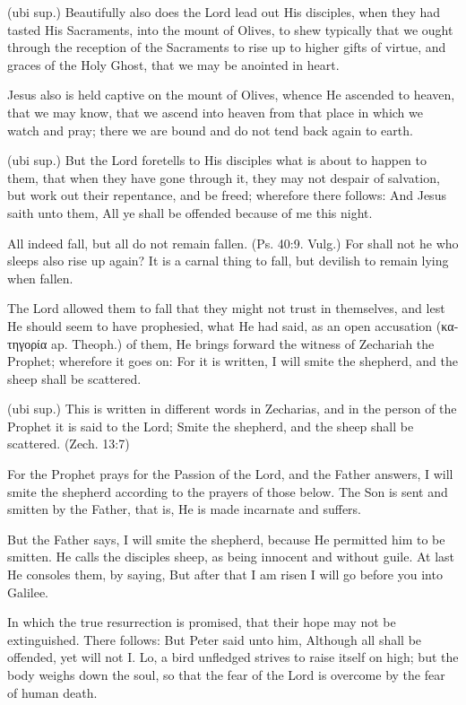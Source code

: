  (ubi sup.) Beautifully also does the Lord lead out His disciples, when they had tasted His Sacraments, into the mount of Olives, to shew typically that we ought through the reception of the Sacraments to rise up to higher gifts of virtue, and graces of the Holy Ghost, that we may be anointed in heart.

 Jesus also is held captive on the mount of Olives, whence He ascended to heaven, that we may know, that we ascend into heaven from that place in which we watch and pray; there we are bound and do not tend back again to earth.

 (ubi sup.) But the Lord foretells to His disciples what is about to happen to them, that when they have gone through it, they may not despair of salvation, but work out their repentance, and be freed; wherefore there follows: And Jesus saith unto them, All ye shall be offended because of me this night.

 All indeed fall, but all do not remain fallen. (Ps. 40:9. Vulg.) For shall not he who sleeps also rise up again? It is a carnal thing to fall, but devilish to remain lying when fallen.

 The Lord allowed them to fall that they might not trust in themselves, and lest He should seem to have prophesied, what He had said, as an open accusation (\textgreek{κατηγορία} ap. Theoph.) of them, He brings forward the witness of Zechariah the Prophet; wherefore it goes on: For it is written, I will smite the shepherd, and the sheep shall be scattered.

 (ubi sup.) This is written in different words in Zecharias, and in the person of the Prophet it is said to the Lord; Smite the shepherd, and the sheep shall be scattered. (Zech. 13:7)

 For the Prophet prays for the Passion of the Lord, and the Father answers, I will smite the shepherd according to the prayers of those below. The Son is sent and smitten by the Father, that is, He is made incarnate and suffers.

 But the Father says, I will smite the shepherd, because He permitted him to be smitten. He calls the disciples sheep, as being innocent and without guile. At last He consoles them, by saying, But after that I am risen I will go before you into Galilee.

 In which the true resurrection is promised, that their hope may not be extinguished. There follows: But Peter said unto him, Although all shall be offended, yet will not I. Lo, a bird unfledged strives to raise itself on high; but the body weighs down the soul, so that the fear of the Lord is overcome by the fear of human death.

